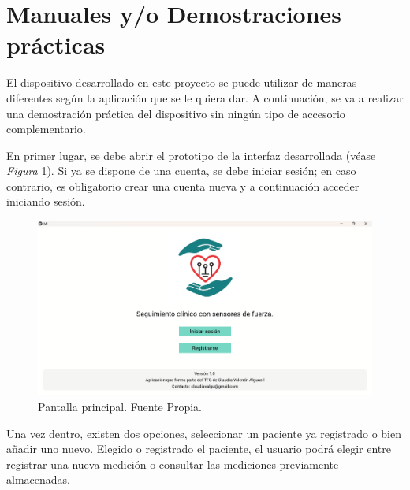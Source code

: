 \section{Manuales y/o Demostraciones prácticas}  

El dispositivo desarrollado en este proyecto se puede utilizar de maneras diferentes según la aplicación que se le quiera dar. A continuación, se va a realizar una demostración práctica del dispositivo sin ningún tipo de accesorio complementario. 

En primer lugar, se debe abrir el prototipo de la interfaz desarrollada (véase \textit{Figura} \ref{fig:Pantalla principal}). Si ya se dispone de una cuenta, se debe iniciar sesión; en caso contrario, es obligatorio crear una cuenta nueva y a continuación acceder iniciando sesión.

 \begin{figure}
        \centering
        \includegraphics[width=1\linewidth]{img/Pantalla principal.png}
        \caption{Pantalla principal. Fuente Propia.}
        \label{fig:Pantalla principal}
\end{figure}

Una vez dentro, existen dos opciones, seleccionar un paciente ya registrado o bien añadir uno nuevo. Elegido o registrado el paciente, el usuario podrá elegir entre registrar una nueva medición o consultar las mediciones previamente almacenadas.

